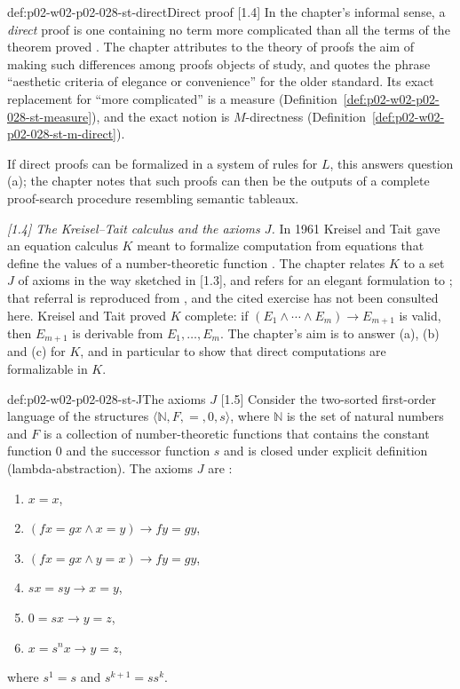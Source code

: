 \begin{hbdefinition}{def:p02-w02-p02-028-st-direct}{Direct proof [1.4]}
In the chapter's informal sense, a \emph{direct} proof is one containing no
term more complicated than all the terms of the theorem proved
\cite[\S1.4, p.~899]{Statman1977}.  The chapter attributes to the theory of
proofs the aim of making such differences among proofs objects of study, and
quotes the phrase ``aesthetic criteria of elegance or convenience'' for the
older standard.  Its exact replacement for ``more complicated'' is a
measure (Definition~\ref{def:p02-w02-p02-028-st-measure}), and the exact notion
is \(M\)-directness (Definition~\ref{def:p02-w02-p02-028-st-m-direct}).
\end{hbdefinition}

If direct proofs can be formalized in a system of rules for \(L\), this
answers question (a); the chapter notes that such proofs can then be the
outputs of a complete proof-search procedure resembling semantic tableaux.

\emph{[1.4] The Kreisel--Tait calculus and the axioms \(J\).}  In 1961
Kreisel and Tait gave an equation calculus \(K\) meant to formalize
computation from equations that define the values of a number-theoretic
function \cite{KreiselTait1961}.  The chapter relates \(K\) to a set \(J\) of
axioms in the way sketched in [1.3], and refers for an elegant formulation to
\cite[Exercise~8, p.~48]{KreiselKrivine1967}; that referral is reproduced from
\cite[\S1.4, p.~899]{Statman1977}, and the cited exercise has not been
consulted here.  Kreisel and Tait proved \(K\) complete: if
\((E_1\land\cdots\land E_m)\to E_{m+1}\) is valid, then \(E_{m+1}\) is
derivable from \(E_1,\ldots,E_m\).  The chapter's aim is to answer (a), (b)
and (c) for \(K\), and in particular to show that direct computations are
formalizable in \(K\).

\begin{hbdefinition}{def:p02-w02-p02-028-st-J}{The axioms \(J\) [1.5]}
Consider the two-sorted first-order language of the structures
\(\langle\mathbb N,F,=,0,s\rangle\), where \(\mathbb N\) is the set of natural
numbers and \(F\) is a collection of number-theoretic functions that contains
the constant function \(0\) and the successor function \(s\) and is closed
under explicit definition (lambda-abstraction).  The axioms \(J\) are
\cite[\S1.5, p.~900]{Statman1977}:
\begin{enumerate}
  \item[(1)] \(x=x\),
  \item[(2)] \((fx=gx\land x=y)\to fy=gy\),
  \item[(3)] \((fx=gx\land y=x)\to fy=gy\),
  \item[(4)] \(sx=sy\to x=y\),
  \item[(5)] \(0=sx\to y=z\),
  \item[(\(6_n\))] \(x=s^nx\to y=z\),
\end{enumerate}
where \(s^1=s\) and \(s^{k+1}=ss^k\).
\end{hbdefinition}

